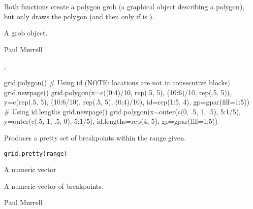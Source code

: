 %
\begin{Details}\relax
Both functions create a polygon grob (a graphical object describing a
polygon), but only 
draws the polygon (and then only if  is ).  
\end{Details}
%
\begin{Value}
A grob object.
\end{Value}
%
\begin{Author}\relax
Paul Murrell
\end{Author}
%
\begin{SeeAlso}\relax
{},
\end{SeeAlso}
%
\begin{Examples}
\begin{ExampleCode}
grid.polygon()
# Using id (NOTE: locations are not in consecutive blocks)
grid.newpage()
grid.polygon(x=c((0:4)/10, rep(.5, 5), (10:6)/10, rep(.5, 5)),
             y=c(rep(.5, 5), (10:6/10), rep(.5, 5), (0:4)/10),
             id=rep(1:5, 4),
             gp=gpar(fill=1:5))
# Using id.lengths
grid.newpage()
grid.polygon(x=outer(c(0, .5, 1, .5), 5:1/5),
             y=outer(c(.5, 1, .5, 0), 5:1/5),
             id.lengths=rep(4, 5),
             gp=gpar(fill=1:5))
\end{ExampleCode}
\end{Examples}
%
\begin{Description}\relax
Produces a pretty set of breakpoints within the range given.
\end{Description}
%
\begin{Usage}
\begin{verbatim}
grid.pretty(range)
\end{verbatim}
\end{Usage}
%
\begin{Arguments}
\begin{ldescription}
\item[\code{range}]  A numeric vector 
\end{ldescription}
\end{Arguments}
%
\begin{Value}
A numeric vector of breakpoints.
\end{Value}
%
\begin{Author}\relax
 Paul Murrell 
\end{Author}
